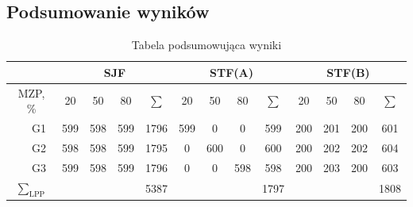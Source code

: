 \documentclass[a4paper,twoside,12pt]{book}
\begin{document}
\subsection{Podsumowanie wyników}
\begin{table}[h]
	\centering
	\caption{Tabela podsumowująca wyniki}
	\label{tab:example}
	\begin{tabular}{|c|c|c|c|c|c|c|c|c|c|c|c|c|c|}
		\hline
		\multicolumn{2}{|c}{}                                              & \multicolumn{4}{|c|}{SJF} & \multicolumn{4}{c|}{STF(A)} & \multicolumn{4}{c|}{STF(B)}                                                                                         \\
		\hline
		\multicolumn{2}{|c|}{MZP, \%}                                      & 20                        & 50                          & 80                          & $\sum$ & 20                    & 50   & 80  & $\sum$ & 20  & 50  & 80  & $\sum$       \\
		\hline
		\parbox[t]{2mm}{}    & G1                        & 599                         & 598                         & 599    & 1796                  & 599  & 0   & 0      & 599 & 200 & 201 & 200    & 601 \\
		                                                                   & G2                        & 598                         & 598                         & 599    & 1795                  & 0    & 600 & 0      & 600 & 200 & 202 & 202    & 604 \\
		                                                                   & G3                        & 599                         & 598                         & 599    & 1796                  & 0    & 0   & 598    & 598 & 200 & 203 & 200    & 603 \\
		\hline
		                          &     & 5387                        &        & 1797   &  & 1808                                                 \\









\end{tabular}
\end{table}
\end{document}
